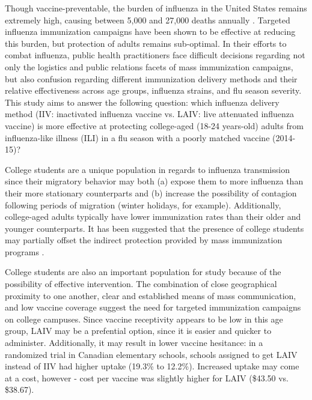 \documentclass[11pt]{article}
\begin{document}
\begin{multicols}{2} 

Though vaccine-preventable, the burden of influenza in the United States remains extremely high, causing between 5,000 and 27,000 deaths annually \cite{Reed2015}.  Targeted influenza immunization campaigns have been shown to be effective at reducing this burden, but protection of adults remains sub-optimal. In their efforts to combat influenza, public health practitioners face difficult decisions regarding not only the logistics and public relations facets of mass immunization campaigns, but also confusion regarding different immunization delivery methods and their relative effectiveness across age groups, influenza strains, and flu season severity.  This study aims to answer the following question: which influenza delivery method (IIV: inactivated influenza vaccine vs. LAIV: live attenuated influenza vaccine) is more effective at protecting college-aged (18-24 years-old) adults from influenza-like illness (ILI) in a flu season with a poorly matched vaccine (2014-15)?


College students are a unique population in regards to influenza transmission since their migratory behavior may both (a) expose them to more influenza than their more stationary counterparts and (b) increase the possibility of contagion following periods of migration (winter holidays, for example). Additionally, college-aged adults typically have lower immunization rates than their older and younger counterparts.  It has been suggested that the presence of college students may partially offset the indirect protection provided by mass immunization programs \cite{Tran2014}.

College students are also an important population for study because of the possibility of effective intervention.  The combination of close geographical proximity to one another, clear and established means of mass communication, and low vaccine coverage suggest the need for targeted immunization campaigns on college campuses. Since vaccine receptivity appears to be low in this age group, LAIV may be a prefential option, since it is easier and quicker to administer.  Additionally, it may result in lower vaccine hesitance: in a randomized trial in Canadian elementary schools, schools assigned to get LAIV instead of IIV had higher uptake (19.3\% to 12.2\%). Increased uptake may come at a cost, however -  cost per vaccine was slightly higher for LAIV (\$43.50 vs. \$38.67). \cite{Kwong2015}


\end{multicols}
\end{document}
